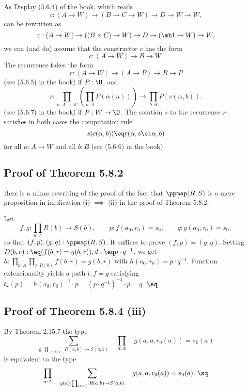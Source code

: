 \documentclass[12pt]{article}
\begin{document}
As Display (5.6.4) of the book, which reads 
$$
c:(A\to W)\to(B\to C\to W)\to D\to W\to W,
$$ 
can be rewritten as 
$$
c:(A\to W)\to((B\times C)\to W)\to D\to(\mb1\to W)\to W,
$$ 
we can (and do) assume that the constructor $c$ has the form 
$$
c:(A\to W)\to B\to W.
$$ 
The recurrence takes the form 
$$
r:(A\to W)\to(A\to P)\to B\to P
$$ 
(see (5.6.5) in the book) if $P:\U$, and 
$$
r:\prod_{\alpha:A\to W}\left(\prod_{a:A} P(\alpha(a))\right)\to\prod_{b:B}P(c(\alpha,b)).
$$ 
(see (5.6.7) in the book) if $P:W\to\U$. The solution $s$ to the recurrence $r$ satisfies in both cases the computation rule
$$
s(c(\alpha,b))\eq r(\alpha,s\ci\alpha,b)
$$ 
for all $\alpha:A\to W$ and all $b:B$ (see (5.6.6) in the book).


\subsection{Proof of Theorem 5.8.2}\label{582}

Here is a minor rewriting of the proof of the fact that $\ppmap(R,S)$ is a mere proposition in implication (i) $\implies$ (ii) in the proof of Theorem 5.8.2: 

Let 
$$
f,g:\prod_{b:A}R(b)\to S(b),\qquad p:f(a_0,r_0)=s_0,\qquad q:g(a_0,r_0)=s_0,
$$ 
so that $(f,p),(g,q):\ppmap(R,S)$. It suffices to prove $(f,p)=(g,q)$. Setting $D(b,r):\eq(f(b,r)=g(b,r)),d:\eq p\cdot q^{-1}$, we get $h:\prod_{b:A}\prod_{r:R(b)}f(b,r)=g(b,r)$ with $h(a_0,r_0)=p\cdot q^{-1}$. Function extensionality yields a path $t:f=g$ satisfying $t_\star(p)=h(a_0,r_0)^{-1}\cdot p=(p\cdot q^{-1})^{-1}\cdot p=q$. $\sq$ 


\subsection{Proof of Theorem 5.8.4 (iii)}

By Theorem 2.15.7 the type 
$$
\sum_{g:\prod_{(a,b:A)}R(a,b)\to S(a,b)}\quad\prod_{a:A}\quad g(a,a,r_0(a))=s_0(a)
$$ 
is equivalent to the type
$$
\prod_{a:A}\quad\sum_{g(a):\prod_{(b:a)}R(a,b)\to S(a,b)}\quad g(a,a,r_0(a))=s_0(a).\ \sq
$$



\end{document}
